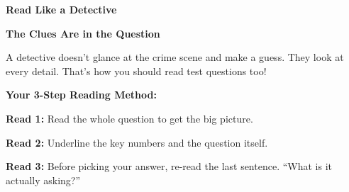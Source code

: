 \clearpage
\thispagestyle{empty}
{\sffamily

\begin{center}
{\fontsize{22}{26}\selectfont\bfseries\color{funGreen} \faUserSecret\hspace{3mm}Read Like a Detective\hspace{3mm}\faUserSecret}

\vspace{2mm}
{\color{funGray}\hrulefill}
\end{center}

\vspace{3mm}

\begin{tcolorbox}[
    enhanced,
    colback=funGreenLight,
    colframe=funGreen!50,
    arc=10pt,
    boxrule=1.5pt,
    left=6mm, right=6mm, top=5mm, bottom=5mm,
]
{\large\bfseries\color{funGreenDark} \faSearch\hspace{2mm}The Clues Are in the Question}

\vspace{2mm}

A detective doesn't glance at the crime scene and make a guess. They look at every detail. That's how you should read test questions too!

\vspace{3mm}

\textbf{Your 3-Step Reading Method:}

\vspace{2mm}

\textcolor{funGreen}{\faGlasses}\hspace{2mm}\textbf{Read 1:} Read the whole question to get the big picture.

\vspace{2mm}

\textcolor{funGreen}{\faHighlighter}\hspace{2mm}\textbf{Read 2:} Underline the key numbers and the question itself.

\vspace{2mm}

\textcolor{funGreen}{\faCheckDouble}\hspace{2mm}\textbf{Read 3:} Before picking your answer, re-read the last sentence. ``What is it actually asking?''
\end{tcolorbox}

\vspace{3mm}

}
